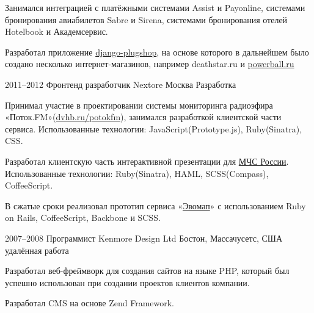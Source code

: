 \documentclass[11pt,a4paper,sans]{moderncv}
\newcommand{\lang}[2]{#1}
\begin{document}
{\cvlistitem
    {\lang
        {Занимался интеграцией с платёжными системами Assist и Payonline, системами бронирования авиабилетов Sabre и Sirena, системами бронирования отелей Hotelbook и Академсервис.}
        {TODO}}

\cvlistitem
    {\lang
        {Разработал приложение \href{https://github.com/ChillyBwoy/django-plugshop}{django-plugshop}, на основе которого в дальнейшем было создано несколько интернет-магазинов, например deathstar.ru и \href{http://powerball.ru}{powerball.ru}}
        {Design applications ... TODO}\newline}


\cventry
    {2011--2012}
    {\lang
        {Фронтенд разработчик}
        {Front-end developer}}
    {Nextore}
    {\lang
        {Москва}
        {Moscow}}
    {}
    {\lang
        {Разработка}
        {Development}}

\cvlistitem
    {\lang
        {Принимал участие в проектировании системы мониторинга радиоэфира «Поток.FM»(\href{https://dvhb.ru/potokfm}{dvhb.ru/potokfm}), занимался разработкой клиентской части сервиса. Использованные технологии: JavaScript(Prototype.js), Ruby(Sinatra), CSS.}
        {Participated in design of system for monitoring of radio broadcasting, designed front-end part of the project. «Potok.FM»(\href{https://dvhb.ru/en/potokfm}{dvhb.ru/potokfm})}}

\cvlistitem
    {\lang
        {Разработал клиентскую часть интерактивной презентации для \href{http://nextore.ru/projects/3}{МЧС России}. Использованные технологии: Ruby(Sinatra), HAML, SCSS(Compass), CoffeeScript.}
        {TODO}}

\cvlistitem
    {\lang
        {В сжатые сроки реализовал прототип сервиса «\href{http://dvhb.ru/evomap}{Эвомап}» с использованием Ruby on Rails, CoffeeScript, Backbone и SCSS.}
        {TODO}\newline}


\cventry
    {2007--2008}
    {\lang
        {Программист}
        {Developer}}
    {Kenmore Design Ltd}
    {\lang
        {Бостон, Массачусетс, США}
        {Boston, MA, US}}
    {\lang
        {удалённая работа}
        {remote work}}
    {}

\cvlistitem
    {\lang
        {Разработал веб-фреймворк для создания сайтов на языке PHP, который был успешно использован при создании проектов клиентов компании.}
        {TODO}}

\cvlistitem
    {\lang
        {Разработал CMS на основе Zend Framework.}
        {TODO}\newline}


}
\end{document}
